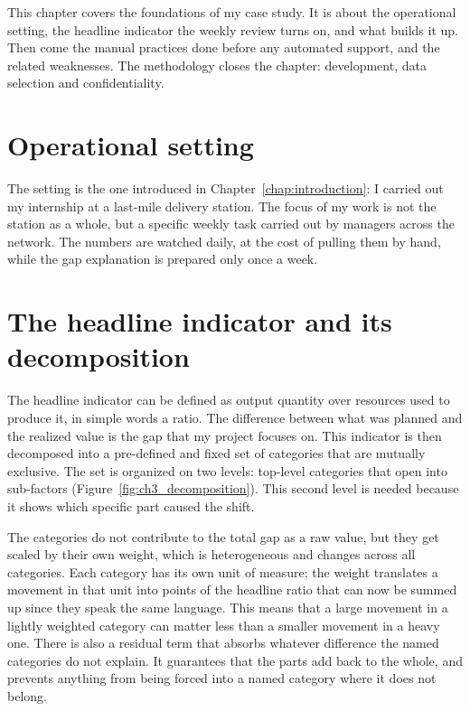 \documentclass[12pt,a4paper,openright,twoside]{book}
\begin{document}
This chapter covers the foundations of my case study. 
It is about the operational setting, the headline indicator the weekly review turns on, and what builds it up.
Then come the manual practices done before any automated support, and the related weaknesses. 
The methodology closes the chapter: development, data selection and confidentiality.


\section{Operational setting}

The setting is the one introduced in Chapter~\ref{chap:introduction}: I carried out my internship at a last-mile delivery station.
The focus of my work is not the station as a whole, but a specific weekly task carried out by managers across the network.
The numbers are watched daily, at the cost of pulling them by hand, while the gap explanation is prepared only once a week.



\section{The headline indicator and its decomposition}

The headline indicator can be defined as output quantity over resources used to produce it, in simple words a ratio. 
The difference between what was planned and the realized value is the gap that my project focuses on.
This indicator is then decomposed into a pre-defined and fixed set of categories that are mutually exclusive.
The set is organized on two levels: top-level categories that open into sub-factors (Figure~\ref{fig:ch3_decomposition}). 
This second level is needed because it shows which specific part caused the shift.


The categories do not contribute to the total gap as a raw value, but they get scaled by their own weight, which is heterogeneous and changes across all categories. 
Each category has its own unit of measure; the weight translates a movement in that unit into points of the headline ratio that can now be summed up since they speak the same language.
This means that a large movement in a lightly weighted category can matter less than a smaller movement in a heavy one.
There is also a residual term that absorbs whatever difference the named categories do not explain. 
It guarantees that the parts add back to the whole, and prevents anything from being forced into a named category where it does not belong.
\end{document}
